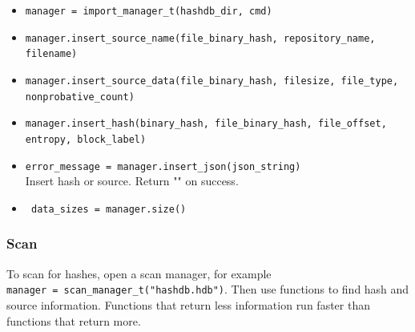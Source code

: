 \documentclass[11pt,fleqn]{article} %
\begin{document}
\begin{itemize}
\item \verb+manager = import_manager_t(hashdb_dir, cmd)+
\item \verb+manager.insert_source_name(file_binary_hash, repository_name, filename)+
\item \verb+manager.insert_source_data(file_binary_hash, filesize, file_type,+\\
\verb+nonprobative_count)+
\item \verb+manager.insert_hash(binary_hash, file_binary_hash, file_offset,+\\
\verb+entropy, block_label)+
\item \verb+error_message = manager.insert_json(json_string)+\\
Insert hash or source. Return "" on success.
\item \verb+ data_sizes = manager.size()+
\end{itemize}

\subsubsection{Scan}
To scan for hashes, open a scan manager, for example\\
\verb+manager = scan_manager_t("hashdb.hdb")+. Then use functions to find hash and source information. Functions that return less information run faster than functions that return more.
\end{document}
